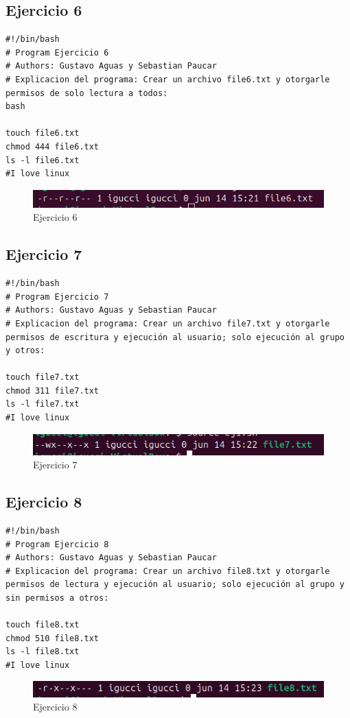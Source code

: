 \documentclass[11pt,twoside]{book}
\begin{document}
\subsection{Ejercicio 6}

\begin{lstlisting}
#!/bin/bash
# Program Ejercicio 6
# Authors: Gustavo Aguas y Sebastian Paucar
# Explicacion del programa: Crear un archivo file6.txt y otorgarle permisos de solo lectura a todos:
bash

touch file6.txt
chmod 444 file6.txt
ls -l file6.txt
#I love linux
\end{lstlisting}
\begin{figure}
    \centering
    \includegraphics[width=1\linewidth]{pnum/ej6.png}
    \caption{Ejercicio 6}
\end{figure}
\newpage
\subsection{Ejercicio 7}
\begin{lstlisting}
#!/bin/bash
# Program Ejercicio 7
# Authors: Gustavo Aguas y Sebastian Paucar
# Explicacion del programa: Crear un archivo file7.txt y otorgarle permisos de escritura y ejecución al usuario; solo ejecución al grupo y otros:

touch file7.txt
chmod 311 file7.txt
ls -l file7.txt
#I love linux
\end{lstlisting}
\begin{figure}
    \centering
    \includegraphics[width=1\linewidth]{pnum/ej7.png}
    \caption{Ejercicio 7}
\end{figure}
\newpage
\subsection{Ejercicio 8}
\begin{lstlisting}
#!/bin/bash
# Program Ejercicio 8
# Authors: Gustavo Aguas y Sebastian Paucar
# Explicacion del programa: Crear un archivo file8.txt y otorgarle permisos de lectura y ejecución al usuario; solo ejecución al grupo y sin permisos a otros:

touch file8.txt
chmod 510 file8.txt
ls -l file8.txt
#I love linux
\end{lstlisting}
\begin{figure}
    \centering
    \includegraphics[width=1\linewidth]{pnum/ej8.png}
    \caption{Ejercicio 8}
\end{figure}
\newpage
\end{document}
